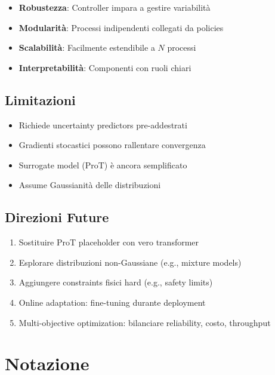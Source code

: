 \documentclass[11pt,a4paper]{article}
\begin{document}
\begin{itemize}
    \item \textbf{Robustezza}: Controller impara a gestire variabilità
    \item \textbf{Modularità}: Processi indipendenti collegati da policies
    \item \textbf{Scalabilità}: Facilmente estendibile a $N$ processi
    \item \textbf{Interpretabilità}: Componenti con ruoli chiari
\end{itemize}

\subsection{Limitazioni}

\begin{itemize}
    \item Richiede uncertainty predictors pre-addestrati
    \item Gradienti stocastici possono rallentare convergenza
    \item Surrogate model (ProT) è ancora semplificato
    \item Assume Gaussianità delle distribuzioni
\end{itemize}

\subsection{Direzioni Future}

\begin{enumerate}
    \item Sostituire ProT placeholder con vero transformer
    \item Esplorare distribuzioni non-Gaussiane (e.g., mixture models)
    \item Aggiungere constraints fisici hard (e.g., safety limits)
    \item Online adaptation: fine-tuning durante deployment
    \item Multi-objective optimization: bilanciare reliability, costo, throughput
\end{enumerate}

\appendix

\section{Notazione}
\end{document}
